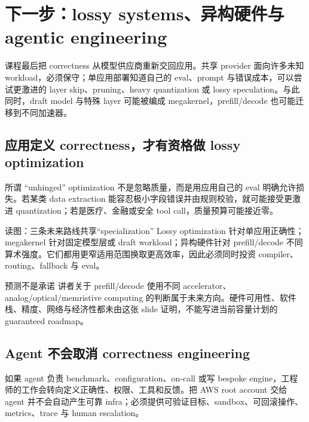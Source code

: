 \section{下一步：lossy systems、异构硬件与 agentic engineering}

课程最后把 correctness 从模型供应商重新交回应用。共享 provider 面向许多未知 workload，必须保守；单应用部署知道自己的 eval、prompt 与错误成本，可以尝试更激进的 layer skip、pruning、heavy quantization 或 lossy speculation。与此同时，draft model 与特殊 layer 可能被编成 megakernel，prefill/decode 也可能迁移到不同加速器。

\subsection{应用定义 correctness，才有资格做 lossy optimization}

所谓 “unhinged” optimization 不是忽略质量，而是用应用自己的 eval 明确允许损失。若某类 data extraction 能容忍极小字段错误并由规则校验，就可能接受更激进 quantization；若是医疗、金融或安全 tool call，质量预算可能接近零。


\begin{knowledgebox}{读图：三条未来路线共享“specialization”}
Lossy optimization 针对单应用正确性；megakernel 针对固定模型层或 draft workload；异构硬件针对 prefill/decode 不同算术强度。它们都用更窄适用范围换取更高效率，因此必须同时投资 compiler、routing、fallback 与 eval。
\end{knowledgebox}

\begin{warningbox}{预测不是承诺}
讲者关于 prefill/decode 使用不同 accelerator、analog/optical/memristive computing 的判断属于未来方向。硬件可用性、软件栈、精度、网络与经济性都未由这张 slide 证明，不能写进当前容量计划的 guaranteed roadmap。
\end{warningbox}

\subsection{Agent 不会取消 correctness engineering}

如果 agent 负责 benchmark、configuration、on-call 或写 bespoke engine，工程师的工作会转向定义正确性、权限、工具和反馈。把 AWS root account 交给 agent 并不会自动产生可靠 infra；必须提供可验证目标、sandbox、可回滚操作、metrics、trace 与 human escalation。

